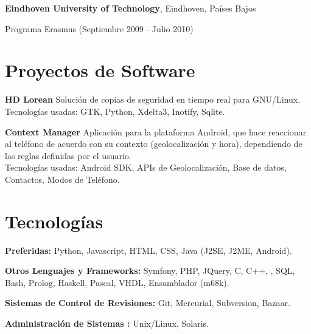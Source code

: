 \documentclass[margin,line]{resume}
\begin{document}
\begin{resume}
{\bf Eindhoven University of Technology}, Eindhoven, Países Bajos\\
\vspace*{-.1in}
\begin{list1}
\item[] Programa Erasmus (Septiembre 2009 - Julio 2010)
\end{list1}

\section{\sc Proyectos de Software } 
\begin{list1}
\item[] {\bf HD Lorean}
Solución de copias de seguridad en tiempo real para GNU/Linux.\\
Tecnologías usadas: GTK, Python, Xdelta3, Inotify, Sqlite.\\

\item[] {\bf Context Manager}
Aplicación para la plataforma Android, que hace reaccionar al teléfono 
de acuerdo con su contexto (geolocalización y hora), dependiendo de las reglas definidas por el usuario.\\
Tecnologías usadas: Android SDK, APIs de Geolocalización, Base de datos,
Contactos, Modos de Teléfono.
\end{list1}

\section{\sc Tecnologías} 
\begin{list1}
\item[]{\bf Preferidas:} Python, Javascript, HTML, CSS, Java (J2SE, J2ME, Android). 
\item[]{\bf Otros Lenguajes y Frameworks:} Symfony, PHP, JQuery, C, C++, , SQL, Bash, Prolog, Haskell, Pascal, VHDL, Ensamblador (m68k).
\item[]{\bf Sistemas de Control de Revisiones:} Git, Mercurial, Subversion, Bazaar.
\item[]{\bf Administración de Sistemas :} Unix/Linux, Solaris.
\end{list1}


\end{resume}
\end{document}
